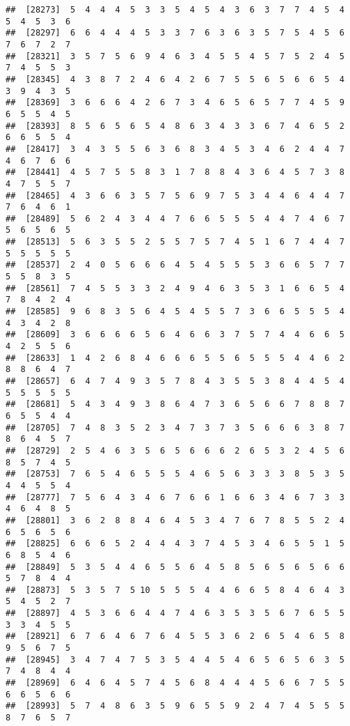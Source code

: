 \documentclass[
]{book}
\begin{document}
\begin{verbatim}
##  [28273]  5  4  4  4  5  3  3  5  4  5  4  3  6  3  7  7  4  5  4  5  4  5  3  6
##  [28297]  6  6  4  4  4  5  3  3  7  6  3  6  3  5  7  5  4  5  6  7  6  7  2  7
##  [28321]  3  5  7  5  6  9  4  6  3  4  5  5  4  5  7  5  2  4  5  7  4  5  5  3
##  [28345]  4  3  8  7  2  4  6  4  2  6  7  5  5  6  5  6  6  5  4  3  9  4  3  5
##  [28369]  3  6  6  6  4  2  6  7  3  4  6  5  6  5  7  7  4  5  9  6  5  5  4  5
##  [28393]  8  5  6  5  6  5  4  8  6  3  4  3  3  6  7  4  6  5  2  6  6  5  5  4
##  [28417]  3  4  3  5  5  6  3  6  8  3  4  5  3  4  6  2  4  4  7  4  6  7  6  6
##  [28441]  4  5  7  5  5  8  3  1  7  8  8  4  3  6  4  5  7  3  8  4  7  5  5  7
##  [28465]  4  3  6  6  3  5  7  5  6  9  7  5  3  4  4  6  4  4  7  7  6  4  6  1
##  [28489]  5  6  2  4  3  4  4  7  6  6  5  5  5  4  4  7  4  6  7  5  6  5  6  5
##  [28513]  5  6  3  5  5  2  5  5  7  5  7  4  5  1  6  7  4  4  7  5  5  5  5  5
##  [28537]  2  4  0  5  6  6  6  4  5  4  5  5  5  3  6  6  5  7  7  5  5  8  3  5
##  [28561]  7  4  5  5  3  3  2  4  9  4  6  3  5  3  1  6  6  5  4  7  8  4  2  4
##  [28585]  9  6  8  3  5  6  4  5  4  5  5  7  3  6  6  5  5  5  4  4  3  4  2  8
##  [28609]  3  6  6  6  6  5  6  4  6  6  3  7  5  7  4  4  6  6  5  4  2  5  5  6
##  [28633]  1  4  2  6  8  4  6  6  6  5  5  6  5  5  5  4  4  6  2  8  8  6  4  7
##  [28657]  6  4  7  4  9  3  5  7  8  4  3  5  5  3  8  4  4  5  4  5  5  5  5  5
##  [28681]  5  4  3  4  9  3  8  6  4  7  3  6  5  6  6  7  8  8  7  6  5  5  4  4
##  [28705]  7  4  8  3  5  2  3  4  7  3  7  3  5  6  6  6  3  8  7  8  6  4  5  7
##  [28729]  2  5  4  6  3  5  6  5  6  6  6  2  6  5  3  2  4  5  6  8  5  7  4  5
##  [28753]  7  6  5  4  6  5  5  5  4  6  5  6  3  3  3  8  5  3  5  4  4  5  5  4
##  [28777]  7  5  6  4  3  4  6  7  6  6  1  6  6  3  4  6  7  3  3  4  6  4  8  5
##  [28801]  3  6  2  8  8  4  6  4  5  3  4  7  6  7  8  5  5  2  4  6  5  6  5  6
##  [28825]  6  6  6  5  2  4  4  4  3  7  4  5  3  4  6  5  5  1  5  6  8  5  4  6
##  [28849]  5  3  5  4  4  6  5  5  6  4  5  8  5  6  5  6  5  6  6  5  7  8  4  4
##  [28873]  5  3  5  7  5 10  5  5  5  4  4  6  6  5  8  4  6  4  3  5  4  5  2  7
##  [28897]  4  5  3  6  6  4  4  7  4  6  3  5  3  5  6  7  6  5  5  3  3  4  5  5
##  [28921]  6  7  6  4  6  7  6  4  5  5  3  6  2  6  5  4  6  5  8  9  5  6  7  5
##  [28945]  3  4  7  4  7  5  3  5  4  4  5  4  6  5  6  5  6  3  5  7  4  8  4  4
##  [28969]  6  4  6  4  5  7  4  5  6  8  4  4  4  5  6  6  7  5  5  6  6  5  6  6
##  [28993]  5  7  4  8  6  3  5  9  6  5  5  9  2  4  7  4  5  5  5  8  7  6  5  7

\end{verbatim}
\end{document}
